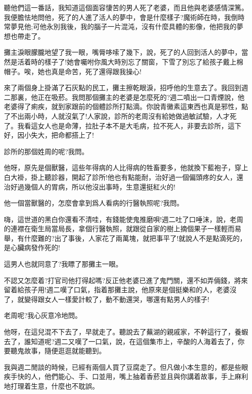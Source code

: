 \documentclass[a6paper]{article}
\begin{document}
聽他們這一番話，我知道這個面容悽苦的男人死了老婆，而且他與老婆感情深篤。我便膽怯地問他，死了的人進了活人的夢中，會是什麼樣子?魔術師在時，我倒時常夢見他;可他永別我後，我的腦子一片混沌，沒有什麼具體的影像，他把我的夢想也帶走了。

攤主淚眼朦朧地望了我一眼，嘴脣哆嗦了幾下，說，死了的人回到活人的夢中，當然是活着時的樣子了!她會囑咐你風大時別忘了關窗，下雪了別忘了給孩子戴上棉帽子。唉，她也真是命苦，死了還得跟我操心!

來了兩個身上掛滿了石灰點的民工，攤主擦乾眼淚，招呼他的生意去了。我回到週二那裏，他正在吸菸。我問那個攤主的老婆是怎麼死的?週二噴出一口青煙說，他老婆得了痢疾，就到家跟前的個體診所打點滴。你說青黴素這東西也真是邪性，點了不出兩小時，人就沒氣了!人家說，診所的老周沒有給她做過敏試驗，人才死了。我看這女人也是命薄，拉肚子本不是大毛病，拉不死人，非要去診所，這下好，因小失大，把命都搭上了!

診所的那個姓周的呢?我問。

他呀，原先是個獸醫，這些年得病的人比得病的牲畜要多，他就換下藍袍子，穿上白大褂，掛上聽診器，開起了診所!他也有點能耐，治好過一個偏頭疼的女人，還治好過幾個人的胃病，所以他沒出事時，生意還挺紅火的!

他一個當獸醫的，怎麼會拿到爲人看病的行醫執照呢?我問。

嗨，這世道的黑白你還看不清哇，有錢能使鬼推磨唄!週二吐了口唾沫，說，老周的連襟在衛生局當局長，拿個行醫執照，就跟從自家的樹上摘個果子一樣輕而易舉，有什麼難的?出了事後，人家花了兩萬塊，就把事平了!就說人不是點滴死的，是心臟病發作死的!

這男人也就同意了?我瞟了那攤主一眼。

不認又怎麼着?打官司他打得起嗎?反正他老婆已進了鬼門關，還不如弄倆錢，將來留着給孩子用!週二嘆了口氣，指着那攤主說，他原來是個挺樂和的人，老婆沒了，就變得跟女人一樣愛計較了，動不動還哭，哪還有點男人的樣子!

老周呢?我心灰意冷地問。

他呀，在這兒混不下去了，早就走了。聽說去了蕪湖的親戚家，不幹這行了，養蝦去了，誰知道呢?週二又嘆了一口氣，說，在這個集市上，辛酸的人海着去了，你要聽鬼故事，隨便逛逛就能聽到。

我與週二閒談的時候，已經有兩個人買了豆腐走了。但凡做小本生意的，都是些眼疾手快的人，他們能心、手、口並用，嘴上抽着香菸並且與你講着故事，手上麻利地打理着生意，什麼也不耽誤。
\end{document}
